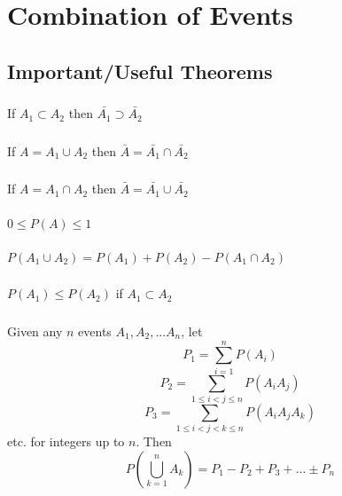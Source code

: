 
\chapter{Combination of Events}

\section{Important/Useful Theorems}

\subsection{}
If $A_1 \subset A_2$ then $\bar{A_1} \supset \bar{A_2}$

\subsection{}
If $A = A_1 \cup A_2$ then $\bar{A} = \bar{A_1} \cap \bar{A_2}$

\subsection{}
If $A = A_1 \cap A_2$ then $\bar{A} = \bar{A_1} \cup \bar{A_2}$

\subsection{}
$0\leq P(A) \leq 1$

\subsection{}
$P(A_1 \cup A_2) = P(A_1) + P(A_2) - P(A_1 \cap A_2 )$

\subsection{}

$P(A_1) \leq P(A_2)$ if $A_1 \subset A_2$

\subsection{}
Given any $n$ events $A_1, A_2, ... A_n$, let
\begin{equation}
	P_1 = \sum_{i=1}^{n} P(A_i)
\end{equation}
\begin{equation}
	P_2 = \sum_{1 \leq i < j \leq n} P(A_iA_j)
\end{equation}
\begin{equation}
	P_3 = \sum_{1 \leq i < j < k \leq n} P(A_i A_j A_k)
\end{equation}
etc. for integers up to $n$.  Then
\begin{equation}
	P\left(\bigcup_{k=1}^n A_k \right) = P_1 -P_2 + P_3 + ... \pm P_n
\end{equation}

